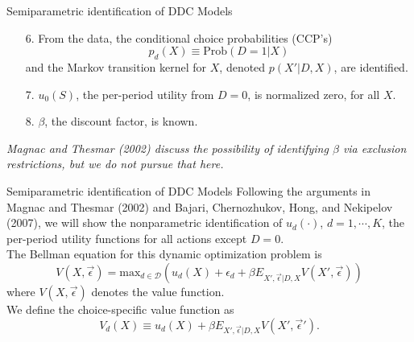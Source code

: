 \begin{frame}{Semiparametric identification of DDC Models}
\begin{enumerate}
\item[6.] From the data, the \alert{conditional choice probabilities (CCP's)}  $$p_d(X) \equiv \text{Prob}(D=1|X)$$ and the Markov transition kernel for $X$, denoted $p(X'|D,X)$, are identified. 
\item[7.] $u_0(S)$, the per-period utility from $D = 0$, is normalized zero, for all $X$. \\
\item[8.] $\beta$, the discount factor, is known.
\end{enumerate}
\textit{Magnac and Thesmar (2002) discuss the possibility of identifying $\beta$ via exclusion restrictions, but we do not pursue that here.}
\end{frame}


\begin{frame}{Semiparametric identification of DDC Models}
Following the arguments in Magnac and Thesmar (2002) and Bajari, Chernozhukov, Hong, and Nekipelov (2007), we will show the nonparametric identification of $u_d(\cdot)$, $d = 1, \cdots , K$, the per-period utility functions for all actions except $D=0$.\\
\vspace{3mm}
The Bellman equation for this dynamic optimization problem is 
\begin{equation*}
V(X, \vec{\epsilon}) = \text{max}_{d \in \mathcal{D}} ( u_d(X) + \epsilon_d + \beta E_{X', \vec{\epsilon} | D, X} V(X', \vec{\epsilon}))
\end{equation*}
where $V(X, \vec{\epsilon})$ denotes the value function. \\
\vspace{0.5cm}
We define the choice-specific value function as
\begin{equation*}
V_d(X) \equiv u_d(X) + \beta E_{X', \vec{\epsilon}|D, X} V(X', \vec{\epsilon}').
\end{equation*}

\end{frame}




